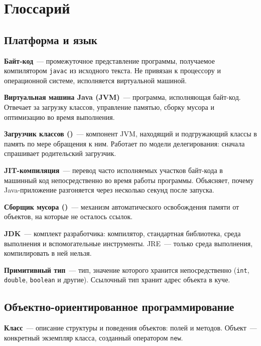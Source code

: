 \chapter*{Глоссарий}

\newcommand{\gloss}[2]{\noindent\textbf{#1}~--- #2\par\vspace{3pt}}

\section*{Платформа и язык}

\gloss{Байт-код}{промежуточное представление программы, получаемое компилятором
\texttt{javac} из исходного текста. Не привязан к процессору и операционной
системе, исполняется виртуальной машиной.}

\gloss{Виртуальная машина Java (JVM)}{программа, исполняющая байт-код. Отвечает
за загрузку классов, управление памятью, сборку мусора и оптимизацию во время
выполнения.}

\gloss{Загрузчик классов ()}{компонент JVM, находящий и
подгружающий классы в память по мере обращения к ним. Работает по модели
делегирования: сначала спрашивает родительский загрузчик.}

\gloss{JIT-компиляция}{перевод часто исполняемых участков байт-кода в машинный
код непосредственно во время работы программы. Объясняет, почему Java-приложение
разгоняется через несколько секунд после запуска.}

\gloss{Сборщик мусора ()}{механизм автоматического
освобождения памяти от объектов, на которые не осталось ссылок.}

\gloss{JDK}{комплект разработчика: компилятор, стандартная библиотека, среда
выполнения и вспомогательные инструменты. JRE~--- только среда выполнения,
компилировать в ней нельзя.}

\gloss{Примитивный тип}{тип, значение которого хранится непосредственно
(\texttt{int}, \texttt{double}, \texttt{boolean} и другие). Ссылочный тип хранит
адрес объекта в куче.}

\section*{Объектно-ориентированное программирование}

\gloss{Класс}{описание структуры и поведения объектов: полей и методов. Объект~---
конкретный экземпляр класса, созданный оператором \texttt{new}.}

